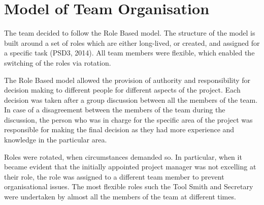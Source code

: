 \documentclass{l3proj}
\begin{document}
\section{Model of Team Organisation}
The team decided to follow the Role Based model. The structure of the model is built around a set of roles which are either long-lived, or created, and assigned for a specific task (PSD3, 2014). All team members were flexible, which enabled the switching of the roles via rotation.
\par
The Role Based model allowed the provision of authority and responsibility for decision making to different people for different aspects of the project. Each decision was taken after a group discussion between all the members of the team. In case of a disagreement between the members of the team during the discussion, the person who was in charge for the specific area of the project was responsible for making the final decision as they had more experience and knowledge in the particular area.
\par
Roles were rotated, when circumstances demanded so. In particular, when it became evident that the initially appointed project manager was not excelling at their role, the role was assigned to a different team member to prevent organisational issues. The most flexible roles such the Tool Smith and Secretary were undertaken by almost all the members of the team at different times.
\end{document}
